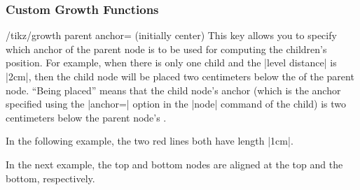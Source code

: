 \subsubsection{Custom Growth Functions}

\begin{key}{/tikz/growth parent anchor= (initially center)}
  This key allows you to specify which anchor of the parent node is
  to be used for computing the children's position. For example, when
  there is only one child and the |level distance| is |2cm|, then the
  child node will be placed two centimeters below the  of
  the parent node. ``Being placed'' means that the child node's
  anchor (which is the anchor specified using the |anchor=| option in
  the |node| command of the child) is two centimeters below the parent
  node's .

  In the following example, the two red lines both have length |1cm|.
\begin{codeexample}[]
\end{codeexample}

  In the next example, the top and bottom nodes are aligned at the top
  and the bottom, respectively.
\begin{codeexample}[]
\end{codeexample}
\end{key}

